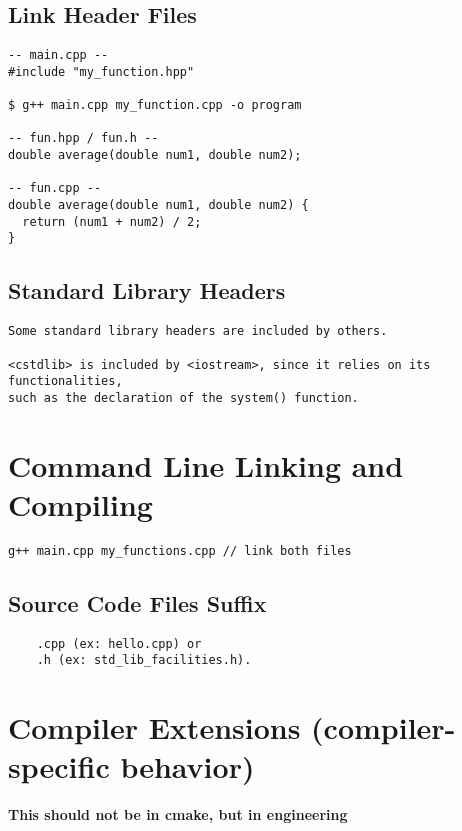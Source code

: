 \documentclass[openany]{report}
\begin{document}
\subsection{Link Header Files}

\begin{verbatim}
-- main.cpp --
#include "my_function.hpp"

$ g++ main.cpp my_function.cpp -o program

-- fun.hpp / fun.h --
double average(double num1, double num2);

-- fun.cpp --
double average(double num1, double num2) {
  return (num1 + num2) / 2;
}
\end{verbatim}

\subsection{Standard Library Headers}

\begin{verbatim}
Some standard library headers are included by others. 

<cstdlib> is included by <iostream>, since it relies on its functionalities,
such as the declaration of the system() function. 
\end{verbatim}

\section{Command Line Linking and Compiling}

\begin{verbatim}
g++ main.cpp my_functions.cpp // link both files
\end{verbatim}

\subsection{Source Code Files Suffix}

\begin{verbatim}
    .cpp (ex: hello.cpp) or
    .h (ex: std_lib_facilities.h).
\end{verbatim}


\section{Compiler Extensions (compiler-specific behavior)}


\textbf{This should not be in cmake, but in engineering}
\end{document}
